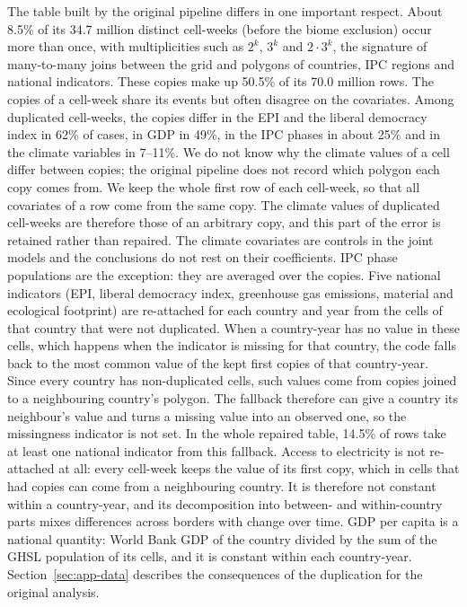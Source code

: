 The table built by the original pipeline differs in one important respect.
About 8.5\% of its 34.7 million distinct cell-weeks (before the biome exclusion)
occur more than once, with multiplicities such as $2^k$, $3^k$ and $2\cdot 3^k$, the
signature of many-to-many joins between the grid and polygons of countries, IPC
regions and national indicators. These copies make up 50.5\% of its 70.0 million
rows. The copies of a cell-week share its events but often disagree on the
covariates. Among duplicated cell-weeks, the copies differ in the EPI and the
liberal democracy index in 62\% of cases, in GDP in 49\%, in the IPC phases in about
25\% and in the climate variables in 7--11\%. We do not know why the climate values
of a cell differ between copies; the original pipeline does not record which
polygon each copy comes from. We keep the whole first row of each cell-week, so that
all covariates of a row come from the same copy. The climate values of duplicated
cell-weeks are therefore those of an arbitrary copy, and this part of the error is
retained rather than repaired. The climate covariates are controls in the joint
models and the conclusions do not rest on their coefficients. IPC
phase populations are the exception: they are averaged over the copies. Five national
indicators (EPI, liberal democracy index, greenhouse gas emissions, material and
ecological footprint) are re-attached for each country and year from the cells of
that country that were not duplicated. When a country-year has no value in these
cells, which happens when the indicator is missing for that country, the code falls
back to the most common value of the kept first copies of that country-year. Since
every country has non-duplicated cells, such values come from copies joined to a
neighbouring country's polygon. The fallback therefore can give a country its
neighbour's value and turns a missing value into an observed one, so the missingness
indicator is not set. In the whole repaired table, 14.5\% of rows take at least one
national indicator from this fallback. Access to electricity is not re-attached at
all: every cell-week keeps the value of its first copy, which in cells that had copies
can come from a neighbouring country. It is therefore not constant within a
country-year, and its decomposition into between- and within-country parts mixes differences across borders with change
over time. GDP per capita is a national quantity: World Bank GDP of the country
divided by the sum of the GHSL population of its cells, and it is constant within
each country-year. Section~\ref{sec:app-data} describes the consequences of the
duplication for the original analysis.

